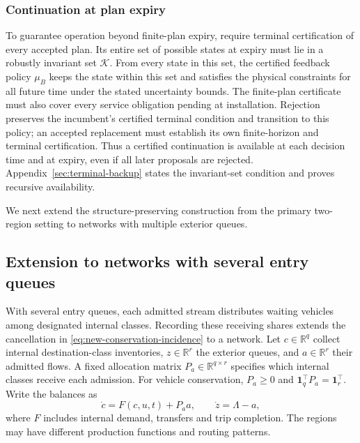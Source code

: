 \documentclass[journal,10pt]{IEEEtran}
\newcommand{\R}{\mathbb{R}}
\newcommand{\appref}[1]{Appendix~\ref{#1}}
\begin{document}
\subsubsection{Continuation at plan expiry}
\label{sec:terminal-backup-main}

To guarantee operation beyond finite-plan expiry, require terminal
certification of every accepted plan. Its entire set of possible states at
expiry must lie in a robustly invariant set $\mathcal K$. From every state
in this set, the certified feedback policy $\mu_B$ keeps the state within this set and satisfies the physical
constraints for all future time under the stated uncertainty bounds. The finite-plan certificate must
also cover every service obligation pending at installation.
Rejection preserves the incumbent's certified terminal condition and
transition to this policy; an accepted replacement must establish its own
finite-horizon and terminal certification. Thus a certified continuation
is available at each decision time and at expiry, even if all later
proposals are rejected. \appref{sec:terminal-backup} states the invariant-set
condition and proves recursive availability.

We next extend the structure-preserving construction from the primary
two-region setting to networks with multiple exterior queues.




\subsection{Extension to networks with several entry queues}
\label{sec:network-extension}

With several entry queues, each admitted stream distributes waiting vehicles
among designated internal classes. Recording these receiving shares extends
the cancellation in \eqref{eq:new-conservation-incidence} to a network.
Let $c\in\R^q$ collect internal destination-class inventories,
$z\in\R^r$ the exterior queues, and $a\in\R^r$ their admitted flows. A fixed
allocation matrix $P_a\in\R^{q\times r}$ specifies which internal classes
receive each admission. For vehicle conservation, $P_a\ge0$ and
$\mathbf1_q^\top P_a=\mathbf1_r^\top$. Write the balances as
\begin{equation}
 \dot c=F(c,u,t)+P_a a,\qquad \dot z=\Lambda-a,
 \label{eq:network-class-queue}
\end{equation}
where $F$ includes internal demand, transfers and trip completion. The
regions may have different production functions and routing patterns.
\end{document}
